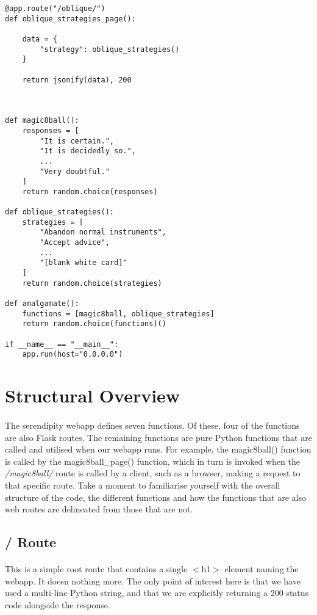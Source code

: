 \begin{lstlisting}
@app.route("/oblique/")
def oblique_strategies_page():

    data = {
        "strategy": oblique_strategies()
    }

    return jsonify(data), 200



def magic8ball():
    responses = [
        "It is certain.", 
        "It is decidedly so.",
        ...
        "Very doubtful."
    ]
    return random.choice(responses)

def oblique_strategies():
    strategies = [
        "Abandon normal instruments",
        "Accept advice",
        ... 
        "[blank white card]"        
    ]
    return random.choice(strategies)

def amalgamate():
    functions = [magic8ball, oblique_strategies]
    return random.choice(functions)()

if __name__ == "__main__":
    app.run(host="0.0.0.0")
\end{lstlisting}

\section{Structural Overview}
\paragraph{} The serendipity webapp defines seven functions. Of these, four of the functions are also Flask routes. The remaining functions are pure Python functions that are called and utilised when our webapp runs. For example, the magic8ball() function is called by the magic8ball\_page() function, which in turn is invoked when the \emph{/magic8ball/} route is called by a client, such as a browser, making a request to that specific route. Take a moment to familiarise yourself with the overall structure of the code, the different functions and how the functions that are also web routes are delineated from those that are not.

\subsection{/ Route}
\paragraph{} This is a simple root route that contains a single $<$h1$>$ element naming the webapp. It doesn nothing more. The only point of interest here is that we have used a multi-line Python string, and that we are explicitly returning a 200 status code alongside the response.

